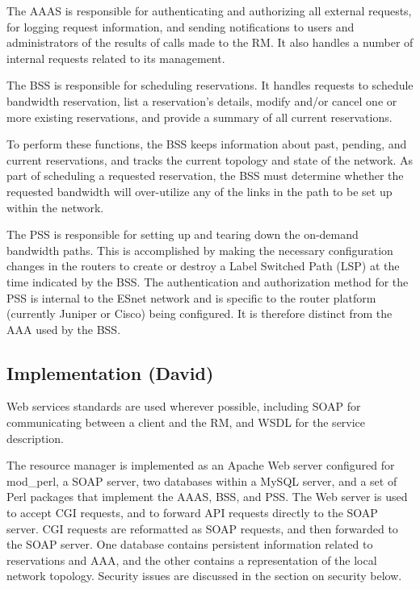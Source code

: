 \documentclass[conference]{IEEEtran}
\begin{document}
The AAAS is responsible for authenticating and authorizing all external 
requests, for logging request information, and sending notifications to
users and administrators of the results of calls made to the RM.  It also
handles a number of internal requests related to its management.

The BSS is responsible for scheduling reservations.  It handles
requests to schedule bandwidth reservation, list a reservation's details,
modify and/or cancel one or more existing reservations, and provide a summary
of all current reservations.

To perform these functions, the BSS keeps information about past,
pending, and current reservations, and tracks the current topology and state of
the network.  As part of scheduling a requested reservation, the BSS must
determine whether the requested bandwidth will over-utilize any of the links
in the path to be set up within the network.

The PSS is responsible for setting up and tearing down the on-demand bandwidth 
paths. This is accomplished by making the necessary configuration changes in 
the routers to create or destroy a Label Switched Path (LSP) at the time
indicated by the BSS. The authentication and authorization method for the PSS 
is internal to the ESnet network and is specific to the router platform 
(currently Juniper or Cisco) being configured.  It is therefore distinct from 
the AAA used by the BSS.

\subsection{Implementation (David)}

Web services standards are used wherever possible, including SOAP
for communicating between a client and the RM, and WSDL for the service
description. 
 
The resource manager is implemented as an Apache Web server configured for
mod\_perl, a SOAP server, two databases within a MySQL server, and a set of 
Perl packages that implement the AAAS, BSS, and PSS.  The Web server is
used to accept CGI requests, and to forward API requests directly to the SOAP 
server.  CGI requests are reformatted as SOAP requests, and then forwarded to 
the SOAP server.  One database contains persistent information related to
reservations and AAA, and the other contains a representation of the local
network topology.  Security issues are discussed in the section on security
below.
\end{document}
